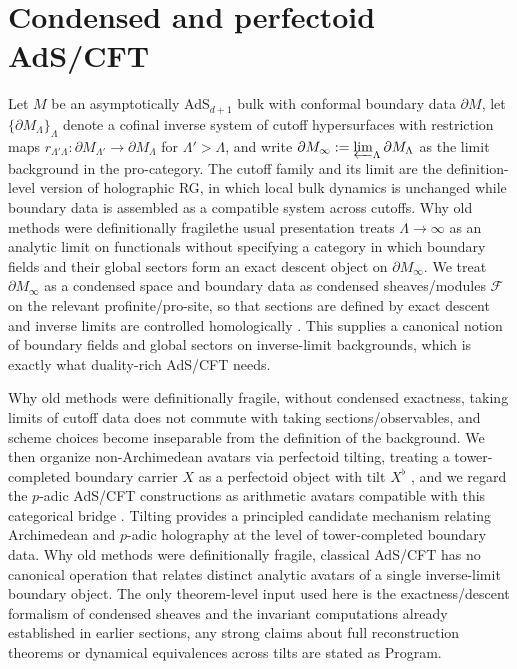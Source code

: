 \documentclass[11pt]{article}
\theoremstyle{remark}
\begin{document}
\section{Condensed and perfectoid AdS/CFT}\label{sec:ads_general}
Let \(M\) be an asymptotically AdS\(_{d+1}\) bulk with conformal boundary data \(\partial M\), let \(\{\partial M_{\Lambda}\}_{\Lambda}\) denote a cofinal inverse system of cutoff hypersurfaces with restriction maps \(r_{\Lambda'\Lambda}:\partial M_{\Lambda'}\to \partial M_{\Lambda}\) for \(\Lambda'>\Lambda\), and write \(\partial M_{\infty}:=\varprojlim_{\Lambda}\partial M_{\Lambda}\) as the limit background in the pro-category. The cutoff family and its limit are the definition-level version of holographic RG, in which local bulk dynamics is unchanged while boundary data is assembled as a compatible system across cutoffs. Why old methods were definitionally fragile\:the usual presentation treats \(\Lambda\to\infty\) as an analytic limit on functionals without specifying a category in which boundary fields and their global sectors form an exact descent object on \(\partial M_{\infty}\). We treat \(\partial M_{\infty}\) as a condensed space and boundary data as condensed sheaves/modules \(\mathcal{F}\) on the relevant profinite/pro-site, so that sections are defined by exact descent and inverse limits are controlled homologically \cite{ClausenScholze}. This supplies a canonical notion of boundary fields and global sectors on inverse-limit backgrounds, which is exactly what duality-rich AdS/CFT needs.

Why old methods were definitionally fragile, without condensed exactness, taking limits of cutoff data does not commute with taking sections/observables, and scheme choices become inseparable from the definition of the background. We then organize non-Archimedean avatars via perfectoid tilting, treating a tower-completed boundary carrier \(X\) as a perfectoid object with tilt \(X^{\flat}\) \cite{Scholze2012}, and we regard the \(p\)-adic AdS/CFT constructions as arithmetic avatars compatible with this categorical bridge \cite{Gubser2017, Heydeman2018}. Tilting provides a principled candidate mechanism relating Archimedean and \(p\)-adic holography at the level of tower-completed boundary data. Why old methods were definitionally fragile, classical AdS/CFT has no canonical operation that relates distinct analytic avatars of a single inverse-limit boundary object. The only theorem-level input used here is the exactness/descent formalism of condensed sheaves and the invariant computations already established in earlier sections, any strong claims about full reconstruction theorems or dynamical equivalences across tilts are stated as Program.
\end{document}

